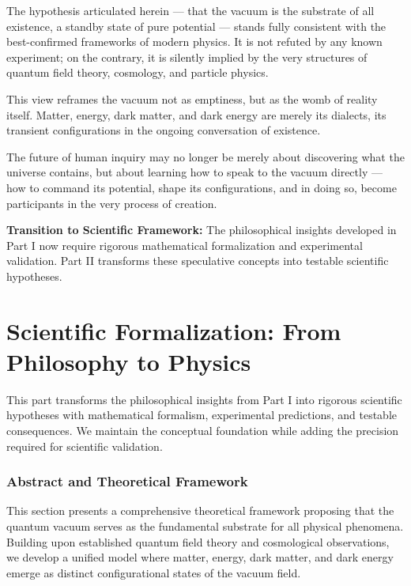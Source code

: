 \documentclass[12pt,a4paper]{article}
\begin{document}
The hypothesis articulated herein — that the vacuum is the substrate of all existence, a standby state of pure potential — stands fully consistent with the best-confirmed frameworks of modern physics. It is not refuted by any known experiment; on the contrary, it is silently implied by the very structures of quantum field theory, cosmology, and particle physics.

This view reframes the vacuum not as emptiness, but as the womb of reality itself. Matter, energy, dark matter, and dark energy are merely its dialects, its transient configurations in the ongoing conversation of existence.

The future of human inquiry may no longer be merely about discovering what the universe contains, but about learning how to speak to the vacuum directly — how to command its potential, shape its configurations, and in doing so, become participants in the very process of creation.

\begin{bridgebox}
\textbf{Transition to Scientific Framework:} The philosophical insights developed in Part I now require rigorous mathematical formalization and experimental validation. Part II transforms these speculative concepts into testable scientific hypotheses.
\end{bridgebox}



\part{Scientific Formalization: From Philosophy to Physics}

\begin{scientificbox}
This part transforms the philosophical insights from Part I into rigorous scientific hypotheses with mathematical formalism, experimental predictions, and testable consequences. We maintain the conceptual foundation while adding the precision required for scientific validation.
\end{scientificbox}

\section{Abstract and Theoretical Framework}

This section presents a comprehensive theoretical framework proposing that the quantum vacuum serves as the fundamental substrate for all physical phenomena. Building upon established quantum field theory and cosmological observations, we develop a unified model where matter, energy, dark matter, and dark energy emerge as distinct configurational states of the vacuum field.
\end{document}
